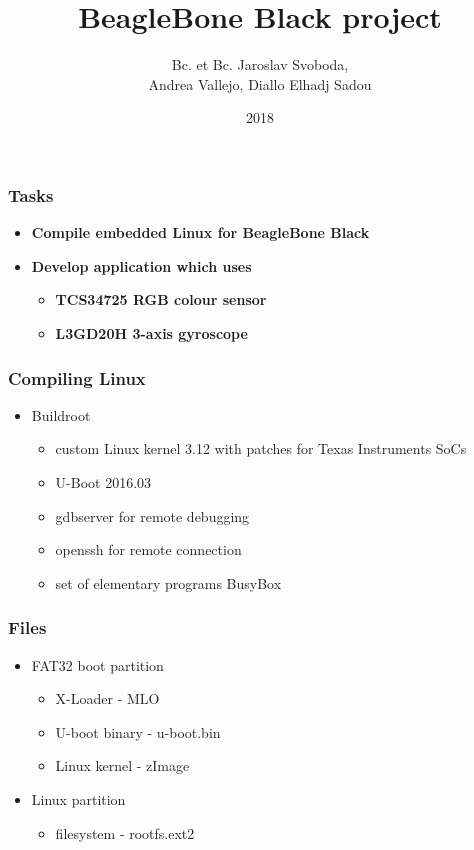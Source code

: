 \documentclass{beamer}
\title{BeagleBone Black project}
\author{Bc. et Bc. Jaroslav Svoboda, \\Andrea Vallejo, Diallo Elhadj Sadou}
\institute{Advanced Digital Architectures}
\date{2018}
\begin{document}
\frame{\titlepage}
\begin{frame}
	\frametitle{Tasks}
		\begin{itemize}
			\item \textbf{Compile embedded Linux for BeagleBone Black}
			\item \textbf{Develop application which uses}
			\begin{itemize}
				\item \textbf{TCS34725 RGB colour sensor}
				\item \textbf{L3GD20H 3-axis gyroscope}
			\end{itemize}
		\end{itemize}
\end{frame}
\begin{frame}
	\frametitle{Compiling Linux}
		\begin{itemize}
			\item Buildroot
			\begin{itemize}
				\item custom Linux kernel 3.12 with patches for Texas Instruments SoCs
				\item U-Boot 2016.03
				\item gdbserver for remote debugging
				\item openssh for remote connection
				\item set of elementary programs BusyBox
			\end{itemize}
		\end{itemize}
\end{frame}

\begin{frame}
	\frametitle{Files}
		\begin{itemize}
			\item FAT32 boot partition
			\begin{itemize}
				\item X-Loader - MLO
				\item U-boot binary - u-boot.bin
				\item Linux kernel - zImage
			\end{itemize}
		\item Linux partition
			\begin{itemize}
				\item filesystem - rootfs.ext2
			\end{itemize}
		\end{itemize}
\end{frame}
\end{document}
